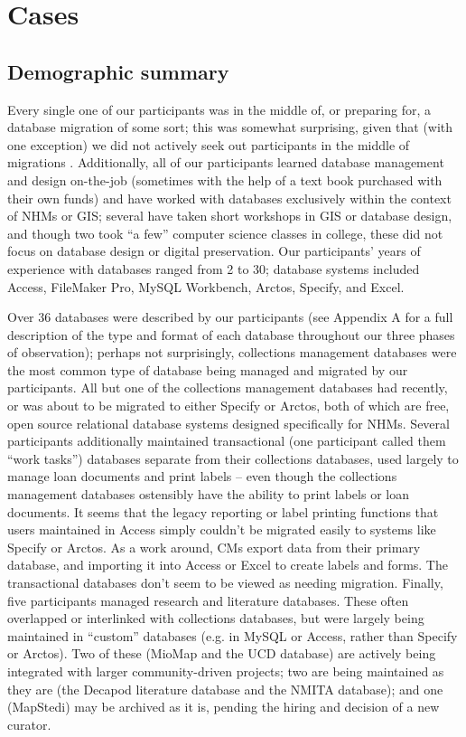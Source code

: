\section{Cases}

\subsection{Demographic summary}

Every single one of our participants was in the middle of, or preparing for, a database migration of some sort; this was somewhat surprising, given that (with one exception) we did not actively seek out participants in the middle of migrations . Additionally, all of our participants learned database management and design on-the-job (sometimes with the help of a text book purchased with their own funds) and have worked with databases exclusively within the context of NHMs or GIS; several have taken short workshops in GIS or database design, and though two took “a few” computer science classes in college, these did not focus on database design or digital preservation. Our participants’ years of experience with databases ranged from 2 to 30; database systems included Access, FileMaker Pro, MySQL Workbench, Arctos, Specify, and Excel.

Over 36 databases were described by our participants (see Appendix A for a full description of the type and format of each database throughout our three phases of observation); perhaps not surprisingly, collections management databases were the most common type of database being managed and migrated by our participants. All but one of the collections management databases had recently, or was about to be migrated to either Specify or Arctos, both of which are free, open source relational database systems designed specifically for NHMs. Several participants additionally maintained transactional (one participant called them “work tasks”) databases separate from their collections databases, used largely to manage loan documents and print labels – even though the collections management databases ostensibly have the ability to print labels or loan documents. It seems that the legacy reporting or label printing functions that users maintained in Access simply couldn’t be migrated easily to systems like Specify or Arctos. As a work around, CMs export data from their primary database, and importing it into Access or Excel to create labels and forms. The transactional databases don’t seem to be viewed as needing migration. Finally, five participants managed research and literature databases. These often overlapped or interlinked with collections databases, but were largely being maintained in “custom” databases (e.g. in MySQL or Access, rather than Specify or Arctos). Two of these (MioMap and the UCD database) are actively being integrated with larger community-driven projects; two are being maintained as they are (the Decapod literature database and the NMITA database); and one (MapStedi) may be archived as it is, pending the hiring and decision of a new curator.


